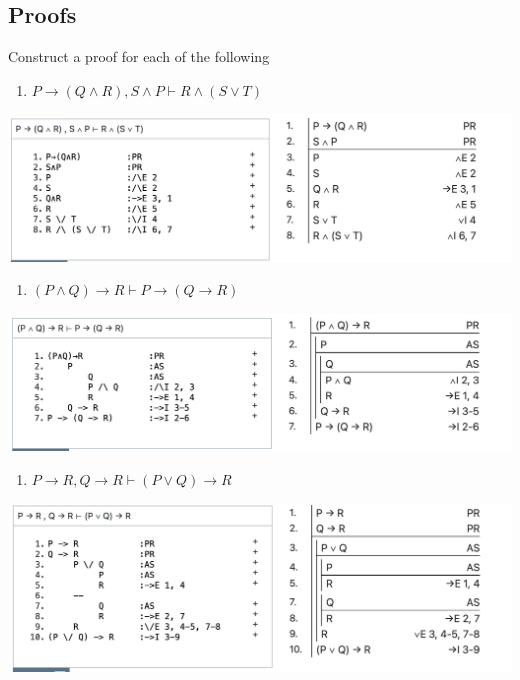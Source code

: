 \documentclass[
  11pt,
]{article}
\providecommand{\tightlist}{%
  \setlength{\itemsep}{0pt}\setlength{\parskip}{0pt}}
\begin{document}
\newpage

\hypertarget{proofs}{%
\subsection{Proofs}\label{proofs}}

Construct a proof for each of the following

\begin{enumerate}
\def\labelenumi{\arabic{enumi}.}
\setcounter{enumi}{8}
\tightlist
\item
  \(P \rightarrow (Q \wedge R), S \wedge P \vdash R \wedge (S \vee T)\)
\end{enumerate}

\includegraphics{q09.png}

\begin{enumerate}
\def\labelenumi{\arabic{enumi}.}
\setcounter{enumi}{9}
\tightlist
\item
  \((P \wedge Q) \rightarrow R \vdash P \rightarrow (Q \rightarrow R)\)
\end{enumerate}

\includegraphics{q10.png}

\begin{enumerate}
\def\labelenumi{\arabic{enumi}.}
\setcounter{enumi}{10}
\tightlist
\item
  \(P \rightarrow R, Q \rightarrow R \vdash (P \vee Q) \rightarrow R\)
\end{enumerate}

\includegraphics{q11.png}
\end{document}
